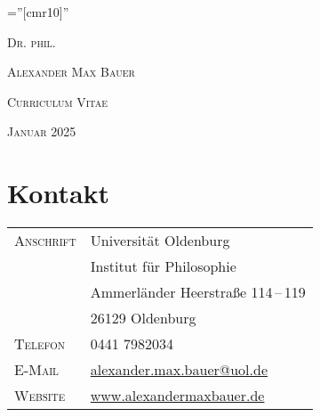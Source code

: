 \documentclass[a4paper,10pt]{article}
\begin{document}
\pagestyle{plain}
\font\fb=''[cmr10]''

\par{\centering
   {\Large\textsc{Dr\hspace{0.5pt}. phil\hspace{0.5pt}.}
   }\bigskip\par}

\par{\centering
   {\Huge\textsc{Alexander Max Bauer}
   }\bigskip\par}

\vspace{1cm}
\par{\centering
   {\Large\textsc{Curriculum Vitae}
   }\bigskip\par}

\par{\centering
   {\Large\textsc{Januar 2025}
   }\bigskip\par}

\vfill
\begin{center}
\end{center}
\vfill


\section{Kontakt}
\begin{longtable}{p{}p{}}
   \textsc{Anschrift}   & Universität Oldenburg\\
                        & Institut für Philosophie\\
                        & Ammerländer Heerstraße 114\,--\,119\\
                        & 26129 Oldenburg\\
   \textsc{Telefon}     & 0441 7982034\\
   \textsc{E-Mail}      & \href{mailto:alexander.max.bauer@uol.de}{alexander.max.bauer@uol.de}\\
   \textsc{Website}     & \href{http://www.alexandermaxbauer.de/}{www.alexandermaxbauer.de}
\end{longtable}


\clearpage
\end{document}

